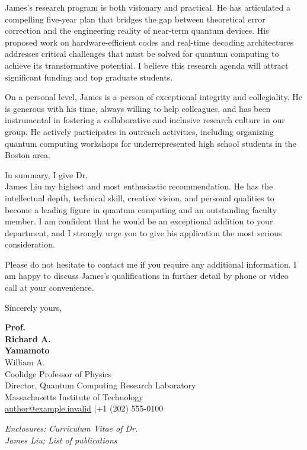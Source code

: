 \documentclass[12pt,a4paper]{article}
\begin{document}
James's research program is both visionary and practical. He has articulated a compelling five-year plan that bridges the gap between theoretical error correction and the engineering reality of near-term quantum devices. His proposed work on hardware-efficient codes and real-time decoding architectures addresses critical challenges that must be solved for quantum computing to achieve its transformative potential. I believe this research agenda will attract significant funding and top graduate students.

On a personal level, James is a person of exceptional integrity and collegiality. He is generous with his time, always willing to help colleagues, and has been instrumental in fostering a collaborative and inclusive research culture in our group. He actively participates in outreach activities, including organizing quantum computing workshops for underrepresented high school students in the Boston area.

In summary, I give Dr.\\ James Liu my highest and most enthusiastic recommendation. He has the intellectual depth, technical skill, creative vision, and personal qualities to become a leading figure in quantum computing and an outstanding faculty member. I am confident that he would be an exceptional addition to your department, and I strongly urge you to give his application the most serious consideration.

Please do not hesitate to contact me if you require any additional information. I am happy to discuss James's qualifications in further detail by phone or video call at your convenience.

\vspace{0.8cm}

Sincerely yours,

\vspace{1.2cm}

\textbf{Prof.\\ Richard A.\\ Yamamoto}\\
William A.\\ Coolidge Professor of Physics\\
Director, Quantum Computing Research Laboratory\\
Massachusetts Institute of Technology\\
\href{mailto:author@example.invalid}{author@example.invalid} \quad|\quad +1 (202) 555-0100

\vspace{1cm}

{\small\color{rulecolor}\textit{Enclosures: Curriculum Vitae of Dr.\\ James Liu; List of publications}}
\end{document}
